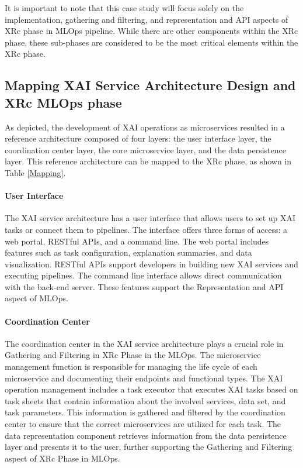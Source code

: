 \documentclass[conference]{IEEEtran}
\begin{document}
It is important to note that this case study will focus solely on the implementation, gathering and filtering, and representation and API aspects of XRc phase in MLOps pipeline. While there are other components within the XRc phase, these sub-phases are considered to be the most critical elements within the XRc phase.
\subsection{Mapping XAI Service Architecture Design and XRc MLOps phase }
As depicted, the development of XAI operations as microservices resulted in a reference architecture composed of four layers: the user interface layer, the coordination center layer, the core microservice layer, and the data persistence layer. This reference architecture can be mapped to the XRc phase, as shown in Table \ref{Mapping}.
\paragraph{User Interface} The XAI service architecture has a user interface that allows users to set up XAI tasks or connect them to pipelines. The interface offers three forms of access: a web portal, RESTful APIs, and a command line. The web portal includes features such as task configuration, explanation summaries, and data visualization. RESTful APIs support developers in building new XAI services and executing pipelines. The command line interface allows direct communication with the back-end server. These features support the Representation and API aspect of MLOps.
\paragraph{Coordination Center} The coordination center in the XAI service architecture plays a crucial role in Gathering and Filtering in XRc Phase in the MLOps. The microservice management function is responsible for managing the life cycle of each microservice and documenting their endpoints and functional types. The XAI operation management includes a task executor that executes XAI tasks based on task sheets that contain information about the involved services, data set, and task parameters. This information is gathered and filtered by the coordination center to ensure that the correct microservices are utilized for each task. The data representation component retrieves information from the data persistence layer and presents it to the user, further supporting the Gathering and Filtering aspect of XRc Phase in MLOps.
\end{document}
